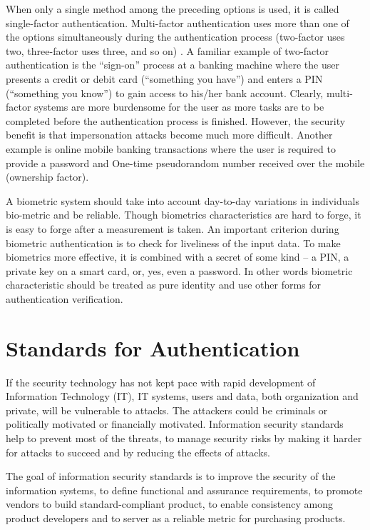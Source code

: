 \begin{multicols}{2}
When only a single method among the preceding options is used, it is called single-factor authentication. Multi-factor authentication uses more than one of the options simultaneously during the authentication process (two-factor uses two, three-factor uses three, and so on) \cite{chap2-key2}. A familiar example of two-factor authentication is the ``sign-on'' process at a banking machine where the user presents a credit or debit card (``something you have'') and enters a PIN (``something you know'') to gain access to his/her bank account. Clearly, multi-factor systems are more burdensome for the user as more tasks are to be completed before the authentication process is finished. However, the security benefit is that impersonation attacks become much more difficult. Another example is online mobile banking transactions where the user is required to provide a password and One-time pseudorandom number received over the mobile (ownership factor).

A biometric system should take into account day-to-day variations in individuals bio-metric and be reliable. Though biometrics characteristics are hard to forge, it is easy to forge after a measurement is taken. An important criterion during biometric authentication is to check for liveliness of the input data. To make biometrics more effective, it is combined with a secret of some kind -- a PIN, a private key on a smart card, or, yes, even a password. In other words biometric characteristic should be treated as pure identity and use other forms for authentication verification.

\section*{Standards for Authentication}

If the security technology has not kept pace with rapid development of Information Technology (IT), IT systems, users and data, both organization and private, will be vulnerable to attacks. The attackers could be criminals or politically motivated or financially motivated. Information security standards help to prevent most of the threats, to manage security risks by making it harder for attacks to succeed and by reducing the effects of attacks.

The goal of information security standards is to improve the security of the information systems, to define functional and assurance requirements, to promote vendors to build standard-compliant product, to enable consistency among product developers and to server as a reliable metric for purchasing products.


\end{multicols}
